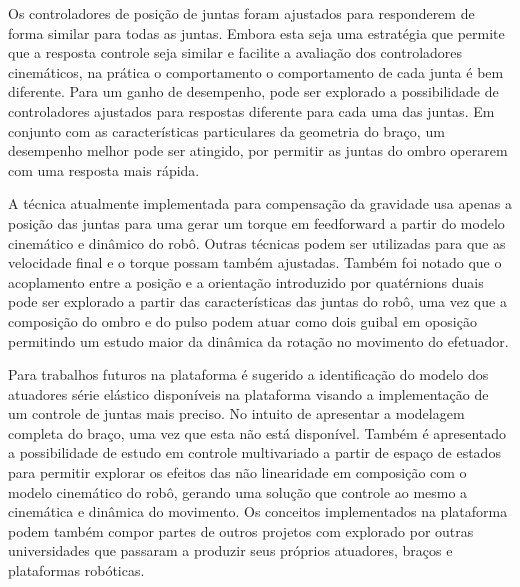 Os controladores de posição de juntas foram ajustados para responderem de forma similar para todas as juntas. Embora esta seja uma estratégia que permite que a resposta controle seja similar e facilite a avaliação dos controladores cinemáticos, na prática o comportamento o comportamento de cada junta é bem diferente. Para um ganho de desempenho, pode ser explorado a possibilidade de controladores ajustados para respostas diferente para cada uma das juntas. Em conjunto com as características particulares da geometria do braço, um desempenho melhor pode ser atingido, por permitir as juntas do ombro operarem com uma resposta mais rápida.

A técnica atualmente implementada para compensação da gravidade usa apenas a posição das juntas para uma gerar um torque em feedforward a partir do modelo cinemático e dinâmico do robô. Outras técnicas podem ser utilizadas para que as velocidade final e o torque possam também ajustadas. Também foi notado que o acoplamento entre a posição e a orientação introduzido por quatérnions duais pode ser explorado a partir das características das juntas do robô, uma vez que a composição do ombro e do pulso podem atuar como dois guibal em oposição permitindo um estudo maior da dinâmica da rotação no movimento do efetuador.

Para trabalhos futuros na plataforma é sugerido a identificação do modelo dos atuadores série elástico disponíveis na plataforma visando a implementação de um controle de juntas mais preciso. No intuito de apresentar a modelagem completa do braço, uma vez que esta não está disponível. Também é apresentado a possibilidade de estudo em controle multivariado a partir de espaço de estados para permitir explorar os efeitos das não linearidade em composição com o modelo cinemático do robô, gerando uma solução que controle ao mesmo a cinemática e dinâmica do movimento. Os conceitos implementados na plataforma podem também compor partes de outros projetos com explorado por outras universidades que passaram a produzir seus próprios atuadores, braços e plataformas robóticas.


